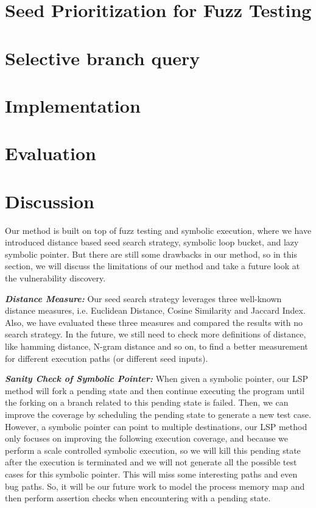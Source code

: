 \documentclass[a4paper]{article}
\begin{document}
\section{Seed Prioritization for Fuzz Testing}


\section{Selective branch query} 


\section{Implementation}



\section{Evaluation}


\section{Discussion}
Our method is built on top of fuzz testing and symbolic execution, where we have introduced distance based seed search strategy, symbolic loop bucket, and lazy symbolic pointer. But there are still some drawbacks in our method, so in this section, we will discuss the limitations of our method and take a future look at the vulnerability discovery.

\noindent\textit{\textbf{Distance Measure:}} Our seed search strategy leverages three well-known distance measures, i.e. Euclidean Distance, Cosine Similarity and Jaccard Index. Also, we have evaluated these three measures and compared the results with no search strategy. In the future, we still need to check more definitions of distance, like hamming distance, N-gram distance and so on, to find a better measurement for different execution paths (or different seed inputs). 

\noindent\textit{\textbf{Sanity Check of Symbolic Pointer:}} When given a symbolic pointer, our LSP method will fork a pending state and then continue executing the program until the forking on a branch related to this pending state is failed. Then, we can improve the coverage by scheduling the pending state to generate a new test case. However, a symbolic pointer can point to multiple destinations, our LSP method only focuses on improving the following execution coverage, and because we perform a scale controlled symbolic execution, so we will kill this pending state after the execution is terminated and we will not generate all the possible test cases for this symbolic pointer. This will miss some interesting paths and even bug paths. So, it will be our future work to model the process memory map and then perform assertion checks when encountering with a pending state.
\end{document}
